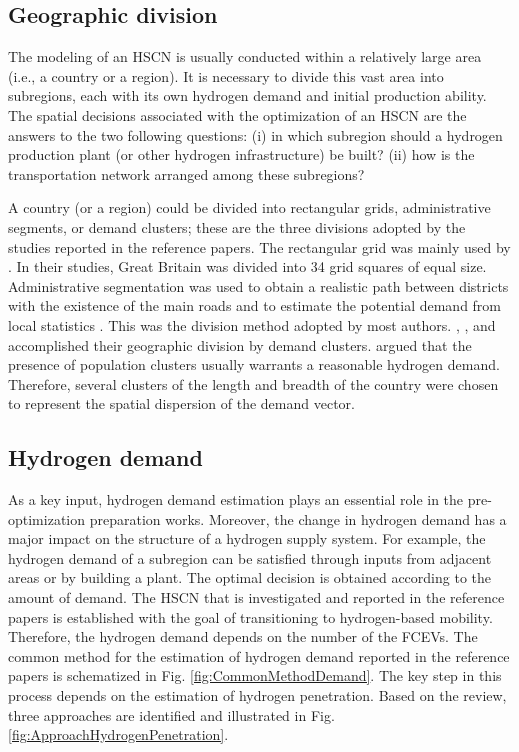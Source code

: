 \documentclass[11pt,3p]{elsarticle}
\begin{document}
\subsection{Geographic division}

The modeling of an HSCN is usually conducted within a relatively large area (i.e., a country or a region). It is necessary to divide this vast area into subregions, each with its own hydrogen demand and initial production ability. The spatial decisions associated with the optimization of an HSCN are the answers to the two following questions: (i) in which subregion should a hydrogen production plant (or other hydrogen infrastructure) be built? (ii) how is the transportation network arranged among these subregions? 

A country (or a region) could be divided into rectangular grids, administrative segments, or demand clusters; these are the three divisions adopted by the studies reported in the reference papers. The rectangular grid was mainly used by \citet{almansoori2006design,almansoori2009design,almansoori2012design}. In their studies, Great Britain was divided into 34 grid squares of equal size. Administrative segmentation was used to obtain a realistic path between districts with the existence of the main roads and to estimate the potential demand from local statistics \citep{almaraz2014hydrogen}. This was the division method adopted by most authors. \citet{konda2011optimal}, \citet{johnson2012spatially}, and \citet{parker2010waste} accomplished their geographic division by demand clusters. \citet{konda2011optimal} argued that the presence of population clusters usually warrants a reasonable hydrogen demand. Therefore, several clusters of the length and breadth of the country were chosen to represent the spatial dispersion of the demand vector.

\subsection{Hydrogen demand}
\label{sec:demand}

As a key input, hydrogen demand estimation plays an essential role in the pre-optimization preparation works. Moreover, the change in hydrogen demand has a major impact on the structure of a hydrogen supply system. For example, the hydrogen demand of a subregion can be satisfied through inputs from adjacent areas or by building a plant. The optimal decision is obtained according to the amount of demand. The HSCN that is investigated and reported in the reference papers is established with the goal of transitioning to hydrogen-based mobility. Therefore, the hydrogen demand depends on the number of the FCEVs. The common method for the estimation of hydrogen demand reported in the reference papers is schematized in Fig. \ref{fig:CommonMethodDemand}. The key step in this process depends on the estimation of hydrogen penetration. Based on the review, three approaches are identified and illustrated in Fig. \ref{fig:ApproachHydrogenPenetration}.
\end{document}
